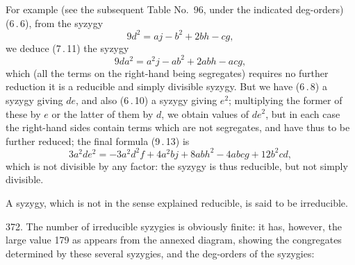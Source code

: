 \documentclass[11pt]{article}
\begin{document}
For example (see the subsequent Table No.\ 96, under the indicated deg-orders) (6\,.\,6), from the syzygy
\[
9d^{2} = aj - b^{2} + 2bh - cg,
\]
we deduce (7\,.\,11) the syzygy
\[
9da^{2} = a^{2}j - ab^{2} + 2abh - acg,
\]
which (all the terms on the right-hand being segregates) requires no further reduction it is a reducible and simply divisible syzygy. But we have (6\,.\,8) a syzygy giving $de$, and also (6\,.\,10) a syzygy giving $e^{2}$; multiplying the former of these by $e$ or the latter of them by $d$, we obtain values of $de^{2}$, but in each case the right-hand sides contain terms which are not segregates, and have thus to be further reduced; the final formula (9\,.\,13) is
\[
3a^{2}de^{2} = -3a^{2}d^{2}f + 4a^{2}bj + 8abh^{2} - 4abcg + 12b^{2}cd,
\]
which is not divisible by any factor: the syzygy is thus reducible, but not simply divisible.

A syzygy, which is not in the sense explained reducible, is said to be irreducible.

372. The number of irreducible syzygies is obviously finite: it has, however, the large value 179 as appears from the annexed diagram, showing the congregates determined by these several syzygies, and the deg-orders of the syzygies:


\clearpage
\end{document}
